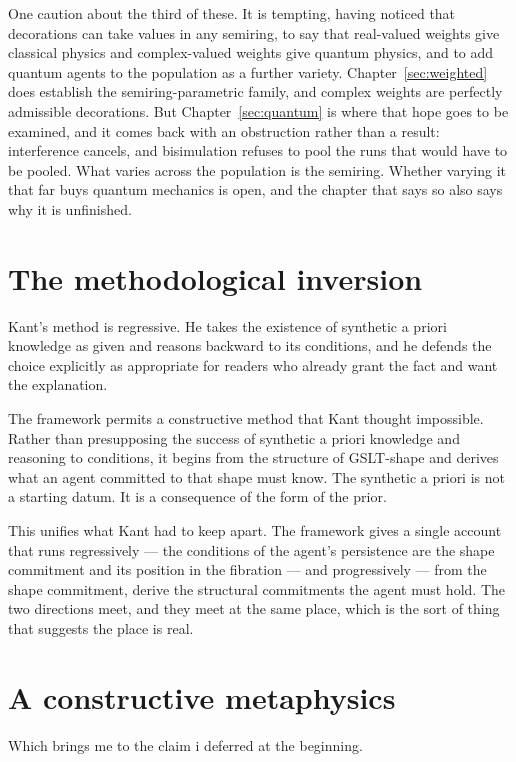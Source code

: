 One caution about the third of these.
It is tempting, having noticed that decorations can take values in
any semiring, to say that real-valued weights give classical
physics and complex-valued weights give quantum physics, and to add
quantum agents to the population as a further variety.
Chapter~\ref{sec:weighted} does establish the semiring-parametric
family, and complex weights are perfectly admissible decorations.
But Chapter~\ref{sec:quantum} is where that hope goes to be
examined, and it comes back with an obstruction rather than a
result: interference cancels, and bisimulation refuses to pool the
runs that would have to be pooled.
What varies across the population is the semiring.
Whether varying it that far buys quantum mechanics is open, and the
chapter that says so also says why it is unfinished.

\section{The methodological inversion}
\label{sec:kant-method}

Kant's method is regressive.
He takes the existence of synthetic a priori knowledge as given and
reasons backward to its conditions, and he defends the choice
explicitly as appropriate for readers who already grant the fact
and want the explanation.

The framework permits a constructive method that Kant thought
impossible.
Rather than presupposing the success of synthetic a priori
knowledge and reasoning to conditions, it begins from the structure
of GSLT-shape and derives what an agent committed to that shape
must know.
The synthetic a priori is not a starting datum.
It is a consequence of the form of the prior.

This unifies what Kant had to keep apart.
The framework gives a single account that runs regressively --- the
conditions of the agent's persistence are the shape commitment and
its position in the fibration --- and progressively --- from the
shape commitment, derive the structural commitments the agent must
hold.
The two directions meet, and they meet at the same place, which is
the sort of thing that suggests the place is real.

\section{A constructive metaphysics}
\label{sec:constructive-metaphysics}

Which brings me to the claim i deferred at the beginning.


